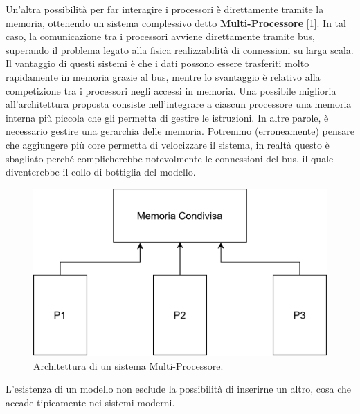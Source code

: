 Un'altra possibilità per far interagire i processori è direttamente tramite la memoria, ottenendo un sistema complessivo detto \textbf{Multi-Processore} [\ref{fig:multi-processore}]. In tal caso, la comunicazione tra i processori avviene direttamente tramite bus, superando il problema legato alla fisica realizzabilità di connessioni su larga scala. Il vantaggio di questi sistemi è che i dati possono essere trasferiti molto rapidamente in memoria grazie al bus, mentre lo svantaggio è relativo alla competizione tra i processori negli accessi in memoria. Una possibile miglioria all'architettura proposta consiste nell'integrare a ciascun processore una memoria interna più piccola che gli permetta di gestire le istruzioni. In altre parole, è necessario gestire una gerarchia delle memoria. 
Potremmo (erroneamente) pensare che aggiungere più core permetta di velocizzare il sistema, in realtà questo è sbagliato perché complicherebbe notevolmente le connessioni del bus, il quale diventerebbe il collo di bottiglia del modello.
\begin{figure}[!ht]
    \centering
    \includegraphics[width=0.5\linewidth]{img/multi-computer.png}
    \caption{Architettura di un sistema Multi-Processore.}
    \label{fig:multi-processore}
\end{figure}
L'esistenza di un modello non esclude la possibilità di inserirne un altro, cosa che accade tipicamente nei sistemi moderni.

